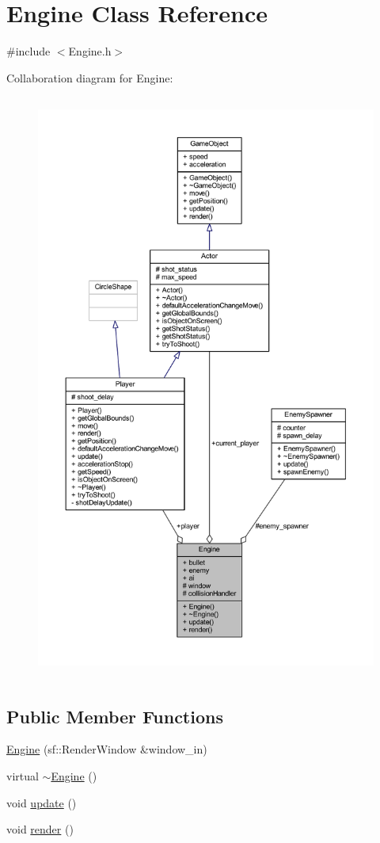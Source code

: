 \hypertarget{class_engine}{}\section{Engine Class Reference}
\label{class_engine}


{\ttfamily \#include $<$Engine.\+h$>$}



Collaboration diagram for Engine\+:
\nopagebreak
\begin{figure}[H]
\begin{center}
\leavevmode
\includegraphics[height=550pt]{class_engine__coll__graph}
\end{center}
\end{figure}
\subsection*{Public Member Functions}
\begin{DoxyCompactItemize}
\item 
\hyperlink{class_engine_a74e8b812fd1bac60a35aaead9c3e81f8}{Engine} (sf\+::\+Render\+Window \&window\+\_\+in)
\item 
virtual \hyperlink{class_engine_a8ef7030a089ecb30bbfcb9e43094717a}{$\sim$\+Engine} ()
\item 
void \hyperlink{class_engine_ad2ff110d5a86c1cd60b541d65915ac48}{update} ()
\item 
void \hyperlink{class_engine_a7960743aefd62e846e7f3cd92c18bc73}{render} ()
\end{DoxyCompactItemize}
